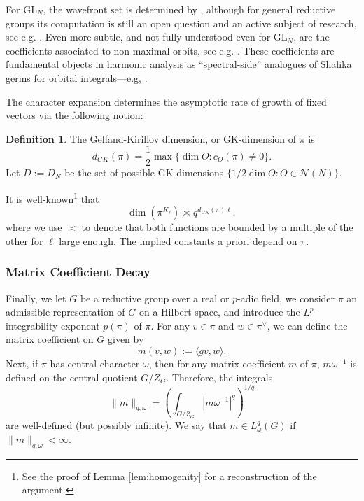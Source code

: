\documentclass{amsart}
\newcommand{\lf}{\left}
\newcommand{\ri}{\right}
\newcommand{\f}{\frac}
\newcommand{\mc}[1]{\mathcal{#1}}
\newcommand{\GL}{\mathrm{GL}}
\newcommand{\om}{\omega}
\newcommand{\1}{\m 1}
\theoremstyle{remark}
\theoremstyle{definition}
\newtheorem{dfn}[thm]{Definition}
\numberwithin{equation}{subsection}
\newcommand{\blue}[1]{\textcolor{blue}{#1}}
\begin{document}
For $\GL_N$, the wavefront set is determined by \cite{MW87}, although for general reductive groups its computation is still an open question and an active subject  of research, see e.g. \cite{tsai2023wave, ciubotaru2025wavefront}.  
Even more subtle, and not fully understood even for $\GL_N$, are the coefficients associated to non-maximal orbits, see e.g. \cite{Mur91GL3, Mur03local, HV24GLn}. These coefficients are fundamental objects in harmonic analysis as ``spectral-side'' analogues of Shalika germs for orbital integrals---e.g, \cite{Mur96}. 

The character expansion determines the asymptotic rate of growth of fixed vectors via the following notion:

\begin{dfn}
The Gelfand-Kirillov dimension, or GK-dimension of $\pi$ is
\[
d_{GK}(\pi) = \f12 \max \{ \dim O : c_O(\pi) \neq 0\}. 
\]
Let $D := D_N$ be the set of possible GK-dimensions $\{1/2\dim O : O \in \mc N(N)\}$.
\end{dfn}

It is well-known\footnote{See the proof of Lemma \ref{lem:homogenity} for a reconstruction of the argument.} that 
\begin{equation} \label{eq:GKexpansion}
\dim(\pi^{K_{\ell}}) \asymp q^{d_{GK}(\pi)\ell},
\end{equation}
where we use $\asymp$ to denote that both functions are bounded by a multiple of the other for $\ell$ large enough. The implied constants a priori depend on $\pi$. 



\subsubsection{Matrix Coefficient Decay}
Finally, we let $G$ be a reductive group over a real or $p$-adic field, we consider $\pi$ an admissible representation of $G$ on a Hilbert space, and introduce the $L^p$-integrability exponent $p(\pi)$ of $\pi$.  For any $v \in \pi$ and $w \in \pi^\vee$, we can define the matrix coefficient on $G$ given by
\[
m(v,w) := \langle gv, w \rangle.
\]
Next, if $\pi$ has central character $\om$, then for any matrix coefficient $m$ of $\pi$, $m\om^{-1}$ is defined on the central quotient $G/Z_G$. Therefore, the integrals
\[
\|m\|_{q, \om} = \lf(\int_{G/Z_G} |m\om^{-1}|^q \ri)^{1/q}
\]
are well-defined (but possibly infinite). We say that $m \in L^q_\om(G)$ if $\|m\|_{q, \om} < \infty$.
\end{document}

